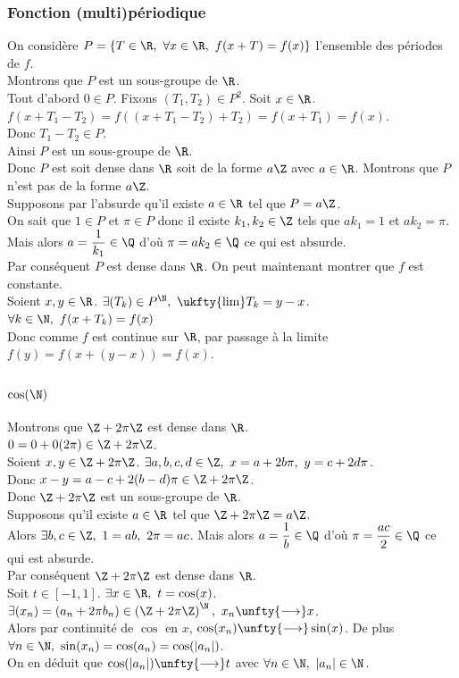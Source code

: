 \documentclass[8pt]{book}
\begin{document}
	\subsubsection{Fonction (multi)périodique }
	On considère $P=\{T\in \R,\ \forall x\in \R,\ f(x+T)=f(x)\}$ l'ensemble des périodes de $f$.\\
	Montrons que $P$ est un sous-groupe de $\R$.\\
	Tout d'abord $0\in P$. Fixons $(T_1,T_2)\in P^2$. Soit $x\in \R$.\\
	$f(x+T_1-T_2)=f((x+T_1-T_2)+T_2)=f(x+T_1)=f(x)$.\\
	Donc $T_1-T_2\in P$.\\
	Ainsi $P$ est un sous-groupe de $\R$.\\
	Donc $P$ est soit dense dans $\R$ soit de la forme $a\Z$ avec $a\in \R$. Montrons que $P$ n'est pas de la forme $a\Z$.\\
	Supposons par l'absurde qu'il existe $a\in \R$ tel que $P=a\Z$.\\
	On sait que $1\in P$ et $\pi\in P$ donc il existe $k_1,k_2\in \Z$ tels que $ak_1=1$ et $ak_2=\pi$. Mais alors $a=\displaystyle\frac{1}{k_1}\in \Q$ d'où $\pi=ak_2\in \Q$ ce qui est absurde.\\
	Par conséquent $P$ est dense dans $\R$. On peut maintenant montrer que $f$ est constante.\\
	Soient $x,y\in \R$. $\exists (T_k)\in P^\N,\ \ukfty{\lim}T_k=y-x$.\\
	$\forall k\in \N,\ f(x+T_k)=f(x)$\\
	Donc comme $f$ est continue sur $\R$, par passage à la limite $f(y)=f(x+(y-x))=f(x)$.
	
	\subsubsection{$\cos(\N)$ }
	Montrons que $\Z+2\pi\Z$ est dense dans $\R$.\\
	$0=0+0(2\pi)\in \Z+2\pi\Z$.\\
	Soient $x,y\in \Z+2\pi\Z$. $\exists a,b,c,d\in \Z,\ x=a+2b\pi,\ y=c+2d\pi$.\\
	Donc $x-y=a-c+2(b-d)\pi\in \Z+2\pi\Z$.\\
	Donc $\Z+2\pi\Z$ est un sous-groupe de $\R$.\\
	Supposons qu'il existe $a\in \R$ tel que $\Z+2\pi\Z=a\Z$.\\
	Alors $\exists b,c\in \Z,\ 1=ab,\ 2\pi=ac$. Mais alors $a=\displaystyle\frac{1}{b}\in \Q$ d'où $\pi=\displaystyle\frac{ac}{2}\in \Q$ ce qui est absurde.\\
	Par conséquent $\Z+2\pi\Z$ est dense dans $\R$.\\
	Soit $t\in [-1,1]$. $\exists x\in \R,\ t=\cos(x)$. $\exists (x_n)=(a_n+2\pi b_n)\in \left(\Z+2\pi\Z\right)^\N,\ x_n\unfty{\longrightarrow}x$.\\
	Alors par continuité de $\cos$ en $x$, $\cos(x_n)\unfty{\longrightarrow}\sin(x)$. De plus $\forall n\in \N,\ \sin(x_n)=\cos(a_n)=\cos(|a_n|)$.\\
	On en déduit que $\cos(|a_n|)\unfty{\longrightarrow}t$ avec $\forall n\in \N,\ |a_n|\in \N$.
	
\end{document}
